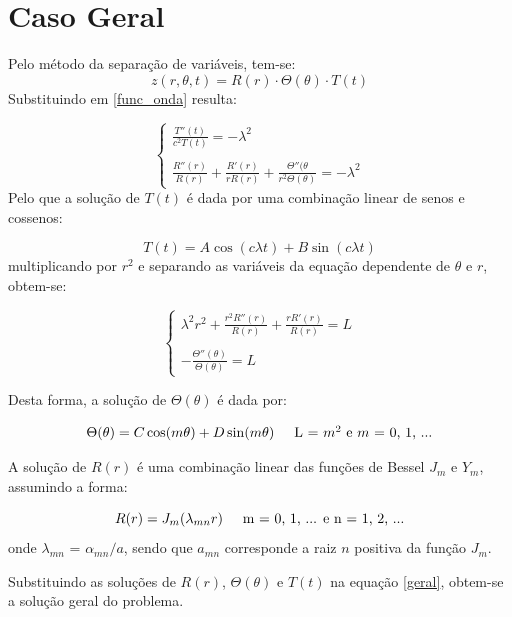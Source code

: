 \documentclass[10pt]{SelfArx} %
\begin{document}
\section*{Caso Geral}
Pelo método da separação de variáveis, tem-se:
\begin{equation}
    z(r,\theta,t) = R(r)\cdot \Theta(\theta)\cdot T(t)
    \label{geral}
\end{equation}
Substituindo em \ref{func_onda} resulta:

\begin{equation*}
    \begin{cases} \frac{T''(t)}{c^2T(t)} = -\lambda^2 \\
    \\
    \frac{R''(r)}{R(r)} + \frac{R'(r)}{rR(r)} + \frac{\Theta''(\theta}{r^2\Theta(\theta)} = -\lambda^2 \end{cases}
\end{equation*}
Pelo que a solução de $T(t)$ é dada por uma combinação linear de senos e cossenos:

\begin{equation*}
    T(t) = A\cos(c\lambda t) + B\sin(c\lambda t)
\end{equation*}
 multiplicando por $r^2$ e separando as variáveis da equação dependente de $\theta$ e $r$, obtem-se:
 
 \begin{equation*}
    \begin{cases} \lambda^2r^2 + \frac{r^2R''(r)}{R(r)} + \frac{rR'(r)}{R(r)}= L \\
    \\
    -\frac{\Theta''(\theta)}{\Theta(\theta)} = L\end{cases}
\end{equation*}

Desta forma, a solução de $\Theta(\theta)$ é dada por:

\begin{equation*}
    \Theta(\theta) = C\cos(m\theta) + D\sin(m\theta) \hspace{0.5 cm}  \mbox{L = $m^2$ e $m$ = 0, 1, ...}
\end{equation*}

A solução de $R(r)$ é uma combinação linear das funções de Bessel $J_m$ e $Y_m$, assumindo a forma:

\begin{equation*}
    R(r) = J_m(\lambda_{mn}r) \hspace{0.5 cm}  \mbox{m = 0, 1, ... e n = 1, 2, ...}
\end{equation*}
onde $\lambda_{mn}$ = $\alpha_{mn}/a$, sendo que $a_{mn}$ corresponde a raiz $n$ positiva da função $J_m$.\par
Substituindo as soluções de $R(r)$, $\Theta(\theta)$ e $T(t)$ na equação \ref{geral}, obtem-se a solução geral do problema.
 
\end{document}
